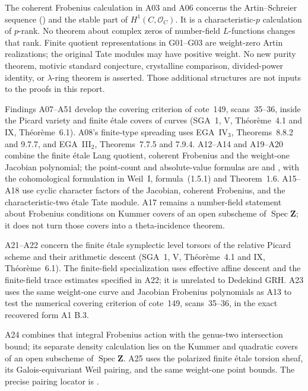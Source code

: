 \documentclass[11pt,a4paper]{article}
\begin{document}
The coherent Frobenius calculation in A03 and A06 concerns the
Artin--Schreier sequence (\cite[Example~7.9(b)]{MilneLEC}) and the stable part of $H^1(C,\mathcal O_C)$.
It is a characteristic-$p$ calculation of $p$-rank. No theorem about
complex zeros of number-field $L$-functions changes that rank.
Finite quotient representations in G01--G03 are weight-zero Artin
realizations; the original Tate modules may have positive weight.
No new purity theorem, motivic standard conjecture, crystalline
comparison, divided-power identity, or $\lambda$-ring theorem is
asserted. Those additional structures are not inputs to the proofs
in this report.


Findings A07--A51 develop the covering criterion of cote~149,
scans~35--36, inside the Picard variety and finite \'etale covers of
curves (SGA~1, V, Th\'eor\`eme~4.1 and IX, Th\'eor\`eme~6.1).
A08's finite-type spreading uses EGA~IV$_3$, Theorems~8.8.2 and
9.7.7, and EGA~III$_2$, Theorems~7.7.5 and 7.9.4.
A12--A14 and A19--A20 combine the finite \'etale Lang quotient,
coherent Frobenius and the weight-one Jacobian polynomial; the
point-count and absolute-value formulas are
\cite[Theorem~19.1(a)--(c)]{MilneAV} and
\cite[Theorem~11.1]{MilneJV}, with the cohomological formulation
in Weil~I, formula~(1.5.1) and Theorem~1.6.
A15--A18 use cyclic character factors of the Jacobian, coherent
Frobenius, and the characteristic-two \'etale Tate module.
A17 remains a number-field statement about Frobenius conditions
on Kummer covers of an open subscheme of $\operatorname{Spec}\mathbf Z$;
it does not turn those covers into a theta-incidence theorem.

A21--A22 concern the finite \'etale symplectic level torsors of the
relative Picard scheme and their arithmetic descent (SGA~1, V,
Th\'eor\`eme~4.1 and IX, Th\'eor\`eme~6.1). The finite-field
specialization uses effective affine descent and the finite-field
trace estimates specified in A22; it is unrelated to Dedekind GRH.
A23 uses the same weight-one curve and Jacobian Frobenius polynomials
as A13 to test the numerical covering criterion of cote~149,
scans~35--36, in the exact recovered form A1 B.3.

A24 combines that integral Frobenius action with the genus-two
intersection bound; its separate density calculation lies on the
Kummer and quadratic covers of an open subscheme of
$\operatorname{Spec}\mathbf Z$. A25 uses the polarized finite
\'etale torsion sheaf, its Galois-equivariant Weil pairing, and
the same weight-one point bounds. The precise pairing locator is
\cite[\S16 and Lemma~16.2(e)]{MilneAV}.
\end{document}
